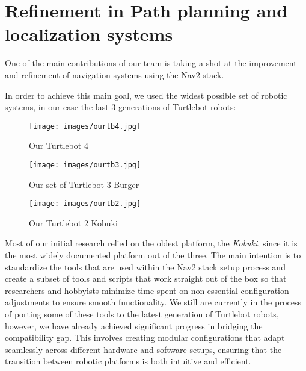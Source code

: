 \documentclass[runningheads,a4paper]{llncs}
\begin{document}
\section{Refinement in Path planning and localization systems}
One of the main contributions of our team is taking a shot at the improvement and refinement of navigation systems using the Nav2 stack.

In order to achieve this main goal, we used the widest possible set of robotic systems, in our case the last 3 generations of Turtlebot robots:
\begin{figure}[H]
    \centering
    \begin{minipage}{0.28\textwidth}
        \centering
        \texttt{[image: images/ourtb4.jpg]}
        \caption{Our Turtlebot 4}
        \label{fig:turtlebot4_1}
    \end{minipage}
    \hfill
    \begin{minipage}{0.28\textwidth}
        \centering
        \texttt{[image: images/ourtb3.jpg]}
        \caption{Our set of Turtlebot 3 Burger}
        \label{fig:turtlebot4_2}
    \end{minipage}
    \hfill
    \begin{minipage}{0.28\textwidth}
        \centering
        \texttt{[image: images/ourtb2.jpg]}
        \caption{Our Turtlebot 2 Kobuki}
        \label{fig:turtlebot4_3}
    \end{minipage}
\end{figure}

Most of our initial research relied on the oldest platform, the \textit{Kobuki}, since it is the most widely documented platform out of the three. The main intention is to standardize the tools that are used within the Nav2 stack setup process and create a subset of tools and scripts that work straight out of the box so that researchers and hobbyists minimize time spent on non-essential configuration adjustments to ensure smooth functionality. We still are currently in the process of porting some of these tools to the latest generation of Turtlebot robots, however, we have already achieved significant progress in bridging the compatibility gap. This involves creating modular configurations that adapt seamlessly across different hardware and software setups, ensuring that the transition between robotic platforms is both intuitive and efficient.\cite{RoboCupUE}
\end{document}
